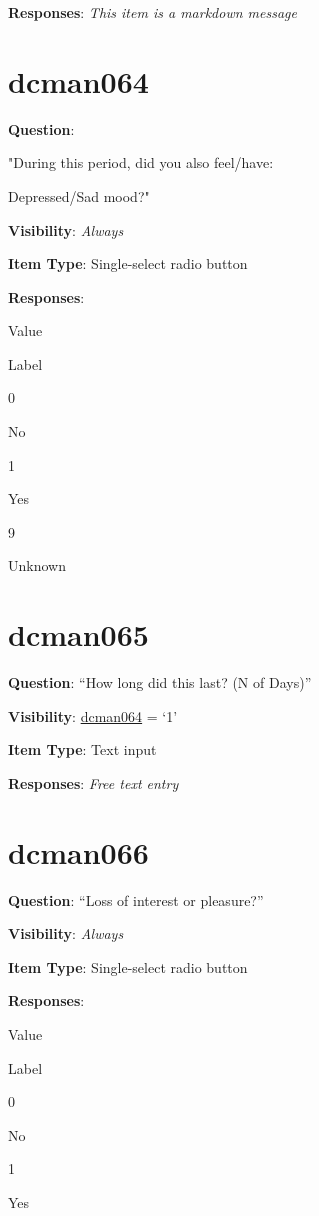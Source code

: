 \documentclass[]{book}
\begin{document}
\textbf{Responses}: \emph{This item is a markdown message}

\hypertarget{dcman064}{%
\section{dcman064}\label{dcman064}}

\textbf{Question}:

"During this period, did you also feel/have:

Depressed/Sad mood?"

\textbf{Visibility}: \emph{Always}

\textbf{Item Type}: Single-select radio button

\textbf{Responses}:

Value

Label

0

No

1

Yes

9

Unknown

\hypertarget{dcman065}{%
\section{dcman065}\label{dcman065}}

\textbf{Question}: ``How long did this last? (N of Days)''

\textbf{Visibility}: \protect\hyperlink{dcman064}{dcman064} = `1'

\textbf{Item Type}: Text input

\textbf{Responses}: \emph{Free text entry}

\hypertarget{dcman066}{%
\section{dcman066}\label{dcman066}}

\textbf{Question}: ``Loss of interest or pleasure?''

\textbf{Visibility}: \emph{Always}

\textbf{Item Type}: Single-select radio button

\textbf{Responses}:

Value

Label

0

No

1

Yes
\end{document}
